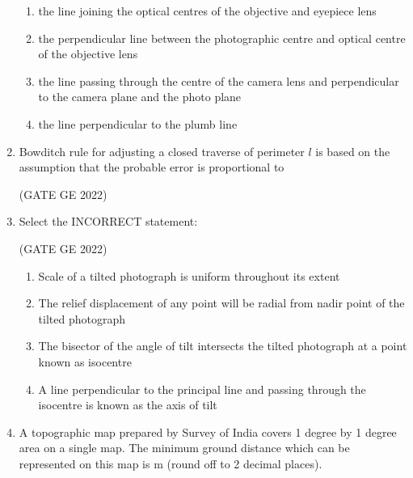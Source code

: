 \documentclass[journal,12pt,onecolumn]{IEEEtran}
\theoremstyle{remark}
\begin{document}
\begin{enumerate}
\begin{enumerate}
    \item the line joining the optical centres of the objective and eyepiece lens
    \item the perpendicular line between the photographic centre and optical centre of the objective lens
    \item the line passing through the centre of the camera lens and perpendicular to the camera plane and the photo plane
    \item the line perpendicular to the plumb line
\end{enumerate}

\item Bowditch rule for adjusting a closed traverse of perimeter $l$ is based on the assumption that the probable error is proportional to

\hfill (GATE GE 2022)

\begin{enumerate}
\end{enumerate}

\item Select the INCORRECT statement:

\hfill (GATE GE 2022)

\begin{enumerate}
    \item Scale of a tilted photograph is uniform throughout its extent
    \item The relief displacement of any point will be radial from nadir point of the tilted photograph
    \item The bisector of the angle of tilt intersects the tilted photograph at a point known as isocentre
    \item A line perpendicular to the principal line and passing through the isocentre is known as the axis of tilt
\end{enumerate}

\item A topographic map prepared by Survey of India covers 1 degree by 1 degree area on a single map. The minimum ground distance which can be represented on this map is \makebox[1cm]{\hrulefill} m (round off to 2 decimal places).


\end{enumerate}
\end{document}
